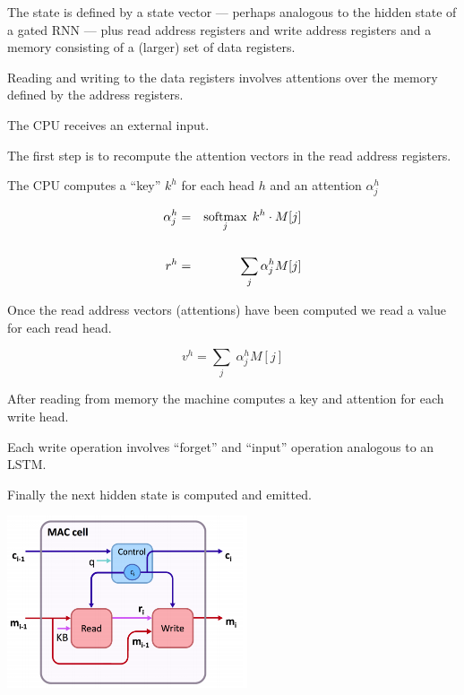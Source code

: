 {

The state is defined by a state vector --- perhaps analogous to the hidden state of a gated RNN --- plus read address registers
and write address registers and a memory consisting of a (larger) set of data registers.

\vfill
Reading and writing to the data registers involves attentions over the memory defined by the address registers.



\vfill
The CPU receives an external input.

\vfill
The first step is to recompute the attention vectors in the read address registers.

\vfill
The CPU computes a ``key'' $k^h$ for each head $h$ and an attention $\alpha_j^h$

\begin{eqnarray*}
  \alpha^h_j & = & \operatorname*{softmax}_j\;k^h \cdot M[j] \\
  \\
  r^h & = & \sum_j \alpha_j^h M[j]
\end{eqnarray*}


Once the read address vectors (attentions) have been computed we read a value for each read head.

\vfill
$$v^h = \sum_j \;\alpha^h_j M[j]$$

After reading from memory the machine computes a key and attention for each write head.

\vfill
Each write operation involves ``forget'' and ``input'' operation analogous to an LSTM.

\vfill
Finally the next hidden state is computed and emitted.


\centerline{\includegraphics[height = 2.0in]{../images/MACcell}}

}
